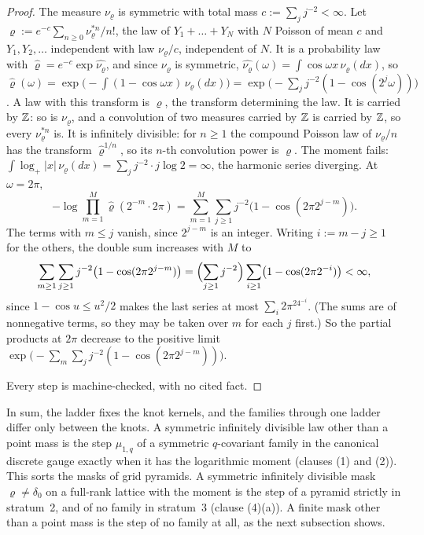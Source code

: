 \begin{proof}
The measure $\nu_\varrho$ is symmetric with total mass $c := \sum_jj^{-2} < \infty$. Let
$\varrho := e^{-c}\sum_{n \ge 0}\nu_\varrho^{*n}/n!$, the law of $Y_1 + \dots + Y_N$ with $N$ Poisson
of mean $c$ and $Y_1, Y_2, \dots$ independent with law $\nu_\varrho/c$, independent of $N$. It is a
probability law with $\widehat\varrho = e^{-c}\exp\widehat{\nu_\varrho}$, and since $\nu_\varrho$ is
symmetric, $\widehat{\nu_\varrho}(\omega) = \int\cos\omega x\,\nu_\varrho(dx)$, so
$\widehat\varrho(\omega) = \exp\bigl(-\int(1 - \cos\omega x)\,\nu_\varrho(dx)\bigr)
= \exp\bigl(-\sum_jj^{-2}(1 - \cos(2^j\omega))\bigr)$. A law with this transform is $\varrho$, the
transform determining the law. It is carried by $\mathbb{Z}$: so is $\nu_\varrho$, and a convolution of two
measures carried by $\mathbb{Z}$ is carried by $\mathbb{Z}$, so every $\nu_\varrho^{*n}$ is. It is infinitely
divisible: for $n \ge 1$ the compound Poisson law of $\nu_\varrho/n$ has the transform
$\widehat\varrho^{1/n}$, so its $n$-th convolution power is $\varrho$. The moment fails:
$\int\log_+|x|\,\nu_\varrho(dx) = \sum_jj^{-2}\cdot j\log 2 = \infty$, the harmonic series diverging.
At $\omega = 2\pi$,
\[
  -\log\prod_{m=1}^M\widehat\varrho(2^{-m}\cdot2\pi) = \sum_{m=1}^M\sum_{j \ge 1}j^{-2}\bigl(1 - \cos(2\pi2^{j-m})\bigr).
\]
The terms with $m \le j$ vanish, since $2^{j-m}$ is an integer. Writing $i := m - j \ge 1$ for the
others, the double sum increases with $M$ to
\[
  \sum_{m \ge 1}\sum_{j \ge 1}j^{-2}\bigl(1 - \cos(2\pi2^{j-m})\bigr) = \Bigl(\sum_{j \ge 1}j^{-2}\Bigr)
  \sum_{i \ge 1}\bigl(1 - \cos(2\pi2^{-i})\bigr) < \infty,
\]
since $1 - \cos u \le u^2/2$ makes the last series at most $\sum_i2\pi^24^{-i}$. (The sums are of
nonnegative terms, so they may be taken over $m$ for each $j$ first.) So the partial products at
$2\pi$ decrease to the positive limit $\exp\bigl(-\sum_m\sum_jj^{-2}(1 - \cos(2\pi2^{j-m}))\bigr)$.

Every step is machine-checked, with no cited fact.
\end{proof}

In sum, the ladder fixes the knot kernels, and the families through one ladder differ only between
the knots. A symmetric infinitely divisible law other than a point mass is the step $\mu_{1,q}$ of a
symmetric $q$-covariant family in the canonical discrete gauge exactly when it has the logarithmic
moment (clauses (1) and (2)). This sorts the masks of grid pyramids. A symmetric infinitely
divisible mask $\varrho \ne \delta_0$ on a full-rank lattice with the moment is the step of a
pyramid strictly in stratum~2, and of no family in stratum~3 (clause (4)(a)). A finite mask other
than a point mass is the step of no family at all, as the next subsection shows.


